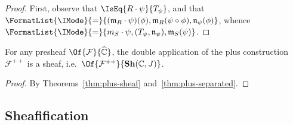 \documentclass{article}
\newcommand\Psh[1]{\widehat{#1}}
\newcommand\Sh[1]{\mathbf{Sh} (#1)}
\newcommand\AreEq[1]{\FormatList{\IMode}{=}{#1}}
\newcommand\PlusPlus[1]{{#1}^{++}}
\begin{document}
\begin{proof}
  First, observe that $\IsEq{R\cdot\psi}{T_\psi}$, and that
  $\AreEq{(\mathfrak{m}_R\cdot\psi)(\phi),\mathfrak{m}_R(\psi\circ\phi),\mathfrak{n}_\psi(\phi)}$,
  whence
  $\AreEq{m_S\cdot\psi,{(T_\psi,\mathfrak{n}_\psi)},\mathfrak{m}_S(\psi)}$.
\end{proof}

\begin{cor}
  For any presheaf $\Of{\mathcal{F}}{\Psh{\mathbb{C}}}$, the double application
  of the plus construction $\PlusPlus{\mathcal{F}}$ is a sheaf, i.e.\
  $\Of{\PlusPlus{\mathcal{F}}}{\Sh{\mathbb{C},J}}$.
\end{cor}
\begin{proof}
  By Theorems~\ref{thm:plus-sheaf} and~\ref{thm:plus-separated}.
\end{proof}

\subsection{Sheafification}
\end{document}
